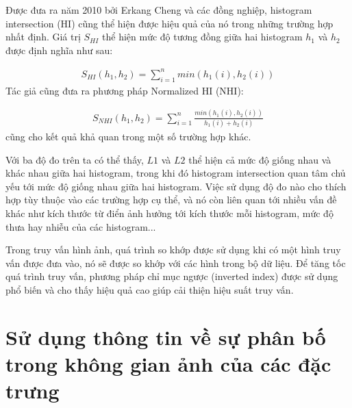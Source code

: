 Được đưa ra năm 2010 bởi Erkang Cheng và các đồng nghiệp\cite{cheng2010mammographic}, histogram intersection (HI) cũng thể hiện được hiệu quả của nó trong những trường hợp nhất định. Giá trị $S_{HI}$ thể hiện mức độ tương đồng giữa hai histogram $h_1$ và $h_2$ được định nghĩa như sau:

\begin{eqnarray}
S_{HI}(h_1, h_2) = \sum\limits_{i = 1}^n min(h_1(i), h_2(i))
\end{eqnarray}
Tác giả cũng đưa ra phương pháp Normalized HI (NHI):

\begin{eqnarray}
S_{NHI}(h_1, h_2) = \sum\limits_{i = 1}^n \frac{min(h_1(i), h_2(i))}{h_1(i) + h_2(i)}
\end{eqnarray}
cũng cho kết quả khả quan trong một số trường hợp khác.

Với ba độ đo trên ta có thể thấy, $L1$ và $L2$ thể hiện cả mức độ giống nhau và khác nhau giữa hai histogram, trong khi đó histogram intersection quan tâm chủ yếu tới mức độ giống nhau giữa hai histogram.
Việc sử dụng độ đo nào cho thích hợp tùy thuộc vào các trường hợp cụ thể, và nó còn liên quan tới nhiều vấn đề khác như kích thước từ điển ảnh hưởng tới kích thước mỗi histogram, mức độ thưa hay nhiễu của các histogram...

Trong truy vấn hình ảnh, quá trình so khớp được sử dụng khi có một hình truy vấn được đưa vào, nó sẽ được so khớp với các hình trong bộ dữ liệu. Để tăng tốc quá trình truy vấn, phương pháp chỉ mục ngược (inverted index) được sử dụng phổ biến và cho thấy hiệu quả cao giúp cải thiện hiệu suất truy vấn.

\section{Sử dụng thông tin về sự phân bố trong không gian ảnh của các đặc trưng}
\label{spatial}

